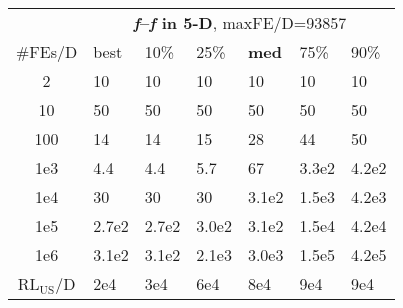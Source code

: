 \begin{tabular}{c|llllll}
 & \multicolumn{6}{|c}{\textbf{\textit{f}\raisebox{-0.35ex}{1}--\textit{f}\raisebox{-0.35ex}{5} in 5-D}, maxFE/D=93857}\\
\#FEs/D & best & 10\% & 25\% & \textbf{med} & 75\% & 90\%\\
2 & 10 & 10 & 10 & 10 & 10 & 10\\
10 & 50 & 50 & 50 & 50 & 50 & 50\\
100 & 14 & 14 & 15 & 28 & 44 & 50\\
1e3 & \hspace*{1ex}4.4 & \hspace*{1ex}4.4 & \hspace*{1ex}5.7 & 67 & 3.3e2 & 4.2e2\\
1e4 & 30 & 30 & 30 & 3.1e2 & 1.5e3 & 4.2e3\\
1e5 & 2.7e2 & 2.7e2 & 3.0e2 & 3.1e2 & 1.5e4 & 4.2e4\\
1e6 & 3.1e2 & 3.1e2 & 2.1e3 & 3.0e3 & 1.5e5 & 4.2e5\\
$\text{RL}_{\text{US}}$/D & 2e4 & 3e4 & 6e4 & 8e4 & 9e4 & 9e4
\end{tabular}
